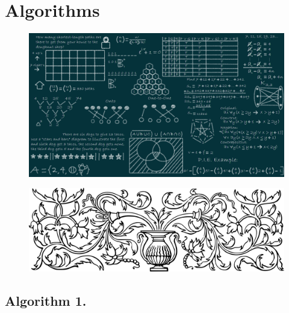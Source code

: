 \documentclass[preview]{standalone}
\begin{document}
\section{Algorithms}
\begin{figure}[!h]
    \centering
    \includegraphics[width=14cm]{../resources/jpg/3.1.algorithms/algorithms.png}
\end{figure}
\pagebreak


\begin{figure}[!h]
    \centering
    \includegraphics[width=14cm]{../resources/jpg/3.1.algorithms/border1.png}
\end{figure}
\subsection[The sum of integers in a list.]{
    \color{section} Algorithm 1.
}

\vspace{1\baselineskip}
\begin{center}
    
\end{center}
\vspace{1\baselineskip}
\begin{center}
    
\end{center}
\end{document}
